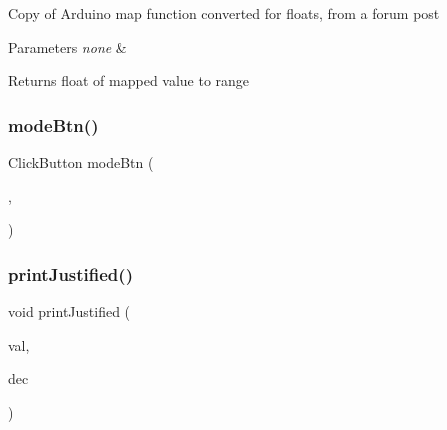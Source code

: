 Copy of Arduino map function converted for floats, from a forum post


\begin{DoxyParams}{Parameters}
{\em none} & \\
\hline
\end{DoxyParams}
\begin{DoxyReturn}{Returns}
float of mapped value to range 
\end{DoxyReturn}
\hypertarget{_u_s_b___tester___o_l_e_d__128x64___beta__2_82_8ino_af30cb44456f6a6654151fdb4a713cda7}{}\label{_u_s_b___tester___o_l_e_d__128x64___beta__2_82_8ino_af30cb44456f6a6654151fdb4a713cda7} 
\subsubsection{\texorpdfstring{mode\+Btn()}{modeBtn()}}
{\footnotesize\ttfamily Click\+Button mode\+Btn (\begin{DoxyParamCaption}\item[{\hyperlink{_u_s_b___tester___o_l_e_d__128x64___beta__2_82_8ino_a19943d19def2dd315b897e30477e005f}{B\+T\+N\+\_\+\+P\+IN}}]{,  }\item[{H\+I\+GH}]{ }\end{DoxyParamCaption})}

\hypertarget{_u_s_b___tester___o_l_e_d__128x64___beta__2_82_8ino_a6771f2bb498a465be30e85611dd728ad}{}\label{_u_s_b___tester___o_l_e_d__128x64___beta__2_82_8ino_a6771f2bb498a465be30e85611dd728ad} 
\subsubsection{\texorpdfstring{print\+Justified()}{printJustified()}\hspace{0.1cm}{\footnotesize\ttfamily [1/2]}}
{\footnotesize\ttfamily void print\+Justified (\begin{DoxyParamCaption}\item[{float}]{val,  }\item[{uint8\+\_\+t}]{dec }\end{DoxyParamCaption})}

